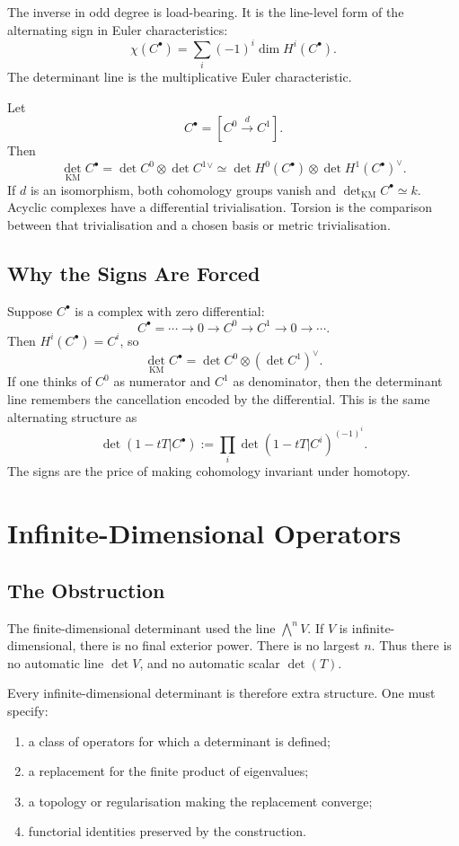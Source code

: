 \documentclass[11pt]{memoir}
\begin{document}
The inverse in odd degree is load-bearing. It is the line-level form
of the alternating sign in Euler characteristics:
\[
  \chi(C^\bullet)=\sum_i(-1)^i\dim H^i(C^\bullet).
\]
The determinant line is the multiplicative Euler characteristic.

\begin{example}
\label{ex:two-term-complex}
Let
\[
  C^\bullet=[C^0\xrightarrow{d}C^1].
\]
Then
\[
  \det_{\mathrm{KM}} C^\bullet
  =
  \det C^0\otimes \det C^1{}^\vee
  \simeq
  \det H^0(C^\bullet)\otimes \det H^1(C^\bullet)^\vee.
\]
If \(d\) is an isomorphism, both cohomology groups vanish and
\(\det_{\mathrm{KM}} C^\bullet\simeq k\). Acyclic complexes have a
differential trivialisation. Torsion is the comparison between that
trivialisation and a chosen basis or metric trivialisation.
\end{example}

\section{Why the Signs Are Forced}
\label{sec:signs-forced}

Suppose \(C^\bullet\) is a complex with zero differential:
\[
  C^\bullet=\cdots\to 0\to C^0\to C^1\to 0\to\cdots.
\]
Then \(H^i(C^\bullet)=C^i\), so
\[
  \det_{\mathrm{KM}} C^\bullet=\det C^0\otimes(\det C^1)^\vee.
\]
If one thinks of \(C^0\) as numerator and \(C^1\) as denominator, then
the determinant line remembers the cancellation encoded by the
differential. This is the same alternating structure as
\[
  \det(1-tT|C^\bullet)
  :=
  \prod_i\det(1-tT|C^i)^{(-1)^i}.
\]
The signs are the price of making cohomology invariant under
homotopy.

\chapter{Infinite-Dimensional Operators}
\label{ch:infinite}

\section{The Obstruction}
\label{sec:infinite-obstruction}

The finite-dimensional determinant used the line
\(\bigwedge^nV\). If \(V\) is infinite-dimensional, there is no final
exterior power. There is no largest \(n\). Thus there is no automatic
line \(\det V\), and no automatic scalar \(\det(T)\).

Every infinite-dimensional determinant is therefore extra structure.
One must specify:
\begin{enumerate}
\item a class of operators for which a determinant is defined;
\item a replacement for the finite product of eigenvalues;
\item a topology or regularisation making the replacement converge;
\item functorial identities preserved by the construction.
\end{enumerate}
\end{document}
